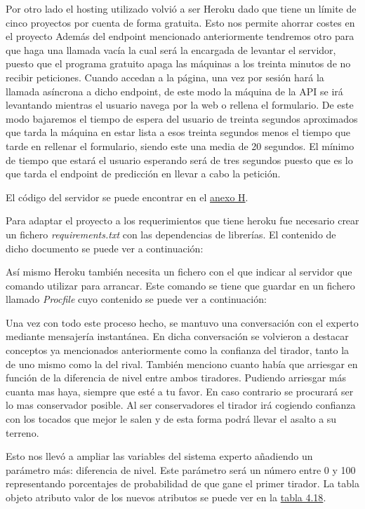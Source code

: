 Por otro lado el hosting utilizado volvió a ser Heroku dado que tiene un límite de cinco
proyectos por cuenta de forma gratuita. Esto nos permite ahorrar costes en el proyecto
Además del endpoint mencionado anteriormente tendremos otro para que haga una llamada vacía
la cual será la encargada de levantar el servidor, puesto que el programa gratuito apaga
las máquinas a los treinta minutos de no recibir peticiones. Cuando accedan a la página, una
vez por sesión hará la llamada asíncrona a dicho endpoint, de este modo la máquina de la API
se irá levantando mientras el usuario navega por la web o rellena el formulario. De este modo
bajaremos el tiempo de espera del usuario de treinta segundos aproximados que tarda la máquina en
estar lista a esos treinta segundos menos el tiempo que tarde en rellenar el formulario, siendo
este una media de 20 segundos. El mínimo de tiempo que estará el usuario esperando será de tres
segundos puesto que es lo que tarda el endpoint de predicción en llevar a cabo la petición.


El código del servidor se puede encontrar en el \hyperref[cap:Codigo servidor API]{anexo H}.


Para adaptar el proyecto a los requerimientos que tiene heroku fue necesario crear un fichero
\textit{requirements.txt} con las dependencias de librerías. El contenido de dicho documento
se puede ver a continuación:



Así mismo Heroku también necesita un fichero con el que indicar al servidor que comando
utilizar para arrancar. Este comando se tiene que guardar en un fichero llamado
\textit{Procfile} cuyo contenido se puede ver a continuación:



Una vez con todo este proceso hecho, se mantuvo una conversación con el experto mediante mensajería
instantánea. En dicha conversación se volvieron a destacar conceptos ya mencionados anteriormente
como la confianza del tirador, tanto la de uno mismo como la del rival. También menciono cuanto
había que arriesgar en función de la diferencia de nivel entre ambos tiradores. Pudiendo
arriesgar más cuanta mas haya, siempre que esté a tu favor. En caso contrario se procurará ser
lo mas conservador posible. Al ser conservadores el tirador irá cogiendo confianza con los
tocados que mejor le salen y de esta forma podrá llevar el asalto a su terreno.

Esto nos llevó a ampliar las variables del sistema experto añadiendo un parámetro más: diferencia
de nivel. Este parámetro será un número entre 0 y 100 representando porcentajes de probabilidad
de que gane el primer tirador. La tabla objeto atributo valor de los nuevos atributos se puede
ver en la \hyperref[tab:Tabla objeto atributo y valor victoria]{tabla 4.18}.

